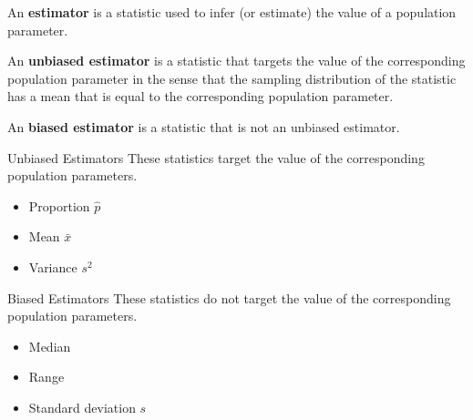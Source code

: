 \documentclass{beamer}
\begin{document}
\begin{frame}
\begin{definition}
An \textbf{estimator} is a statistic used to infer (or estimate) the value of a population parameter.
\end{definition}\pause

\begin{definition}
An \textbf{unbiased estimator} is a statistic that targets the value of the corresponding population parameter in the sense that the sampling distribution of the statistic has a mean that is equal to the corresponding population parameter.
\end{definition}\pause

\begin{definition}
An \textbf{biased estimator} is a statistic that is not an unbiased estimator.
\end{definition}
\end{frame}

\begin{frame}
\begin{block}{Unbiased Estimators}
These statistics target the value of the corresponding population parameters.
\begin{itemize}
\item Proportion $\hat{p}$
\item Mean $\bar{x}$
\item Variance $s^2$
\end{itemize}
\end{block}\pause

\begin{block}{Biased Estimators}
These statistics do not target the value of the corresponding population parameters.
\begin{itemize}
\item Median
\item Range
\item Standard deviation $s$
\end{itemize}
\end{block}
\end{frame}
\end{document}
